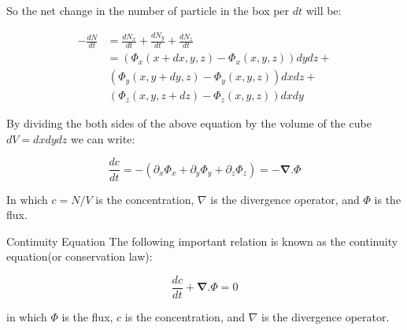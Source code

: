 So the net change in the number of particle in the box per $dt$ will be:

\begin{align*}
	-\frac{dN}{dt} &= \frac{dN_x}{dt} + \frac{dN_y}{dt} + \frac{dN_z}{dt} \\
	&= (\Phi_x(x+dx,y,z)-\Phi_x(x,y,z))dydz + \\
	&\, (\Phi_y(x,y+dy,z)-\Phi_y(x,y,z)) dx dz + \\
	&\, (\Phi_z(x,y,z+dz) - \Phi_z(x,y,z)) dx dy
\end{align*}


By dividing the both sides of the above equation by the volume of the cube $ dV = dx dy dz $ we can write:

\begin{equation*}
	\frac{dc}{dt} = - (\partial_{x}\Phi_x + \partial_{y}\Phi_y + \partial_{z}\Phi_z) = -\mathbf{\nabla} . \Phi
\end{equation*}

In which $c = N/V$ is the concentration, $ \nabla $ is the divergence operator, and $ \Phi $ is the flux. 

\begin{defbox}{Continuity Equation}
	The following important relation is known as the continuity equation(or conservation law):
	
	\begin{equation}
			\frac{dc}{dt} + \mathbf{\nabla} . \Phi = 0
	\end{equation}

	in which $\Phi$ is the flux, $c$ is the concentration, and $ \nabla $ is the divergence operator.
\end{defbox}





